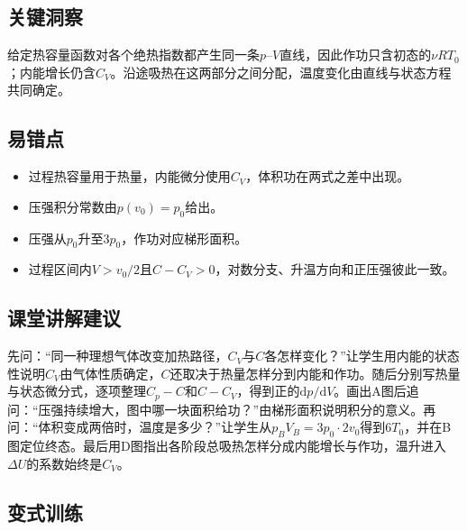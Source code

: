 \documentclass[UTF8,fontset=fandol,a4paper,11pt]{ctexart}
\begin{document}

\subsection*{关键洞察}

给定热容量函数对各个绝热指数都产生同一条$p$--$V$直线，因此作功只含初态的$\nu RT_0$；内能增长仍含$C_V$。沿途吸热在这两部分之间分配，温度变化由直线与状态方程共同确定。



\subsection*{易错点}

\begin{itemize}
\item 过程热容量用于热量，内能微分使用$C_V$，体积功在两式之差中出现。
\item 压强积分常数由$p(v_0)=p_0$给出。
\item 压强从$p_0$升至$3p_0$，作功对应梯形面积。
\item 过程区间内$V>v_0/2$且$C-C_V>0$，对数分支、升温方向和正压强彼此一致。\end{itemize}



\subsection*{课堂讲解建议}

先问：“同一种理想气体改变加热路径，$C_V$与$C$各怎样变化？”让学生用内能的状态性说明$C_V$由气体性质确定，$C$还取决于热量怎样分到内能和作功。随后分别写热量与状态微分式，逐项整理$C_p-C$和$C-C_V$，得到正的$\mathrm dp/\mathrm dV$。画出A图后追问：“压强持续增大，图中哪一块面积给功？”由梯形面积说明积分的意义。再问：“体积变成两倍时，温度是多少？”让学生从$p_BV_B=3p_0\cdot2v_0$得到$6T_0$，并在B图定位终态。最后用D图指出各阶段总吸热怎样分成内能增长与作功，温升进入$\Delta U$的系数始终是$C_V$。



\subsection*{变式训练}
\end{document}
